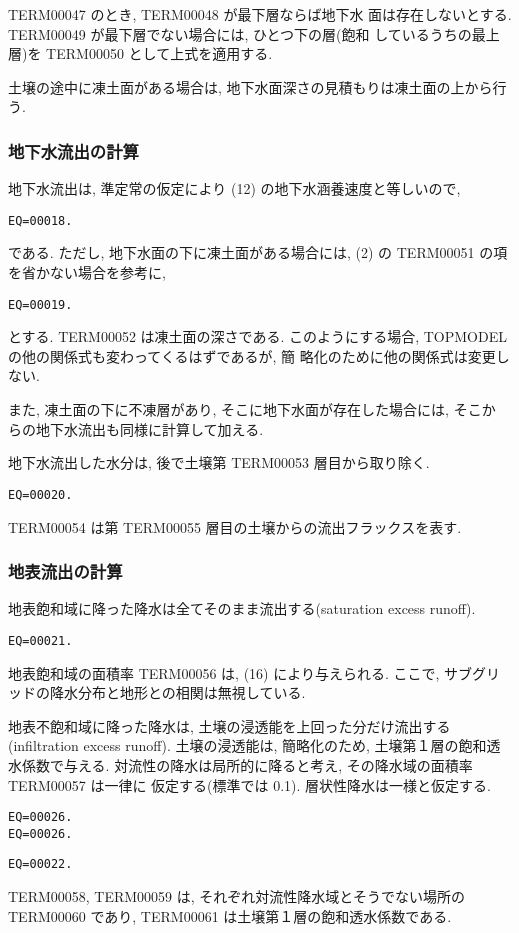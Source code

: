 TERM00047 のとき, TERM00048 が最下層ならば地下水
面は存在しないとする. TERM00049 が最下層でない場合には, ひとつ下の層(飽和
しているうちの最上層)を TERM00050 として上式を適用する.

土壌の途中に凍土面がある場合は, 地下水面深さの見積もりは凍土面の上から行
う.

\subsubsection{地下水流出の計算}

地下水流出は, 準定常の仮定により (12) の地下水涵養速度と等しいので,
\begin{verbatim}
EQ=00018.
\end{verbatim}
である.
ただし, 地下水面の下に凍土面がある場合には, (2) の
TERM00051 の項を省かない場合を参考に,
\begin{verbatim}
EQ=00019.
\end{verbatim}
とする. TERM00052 は凍土面の深さである.
このようにする場合, TOPMODEL の他の関係式も変わってくるはずであるが, 簡
略化のために他の関係式は変更しない.

また, 凍土面の下に不凍層があり, そこに地下水面が存在した場合には, そこか
らの地下水流出も同様に計算して加える.

地下水流出した水分は, 後で土壌第 TERM00053 層目から取り除く.
\begin{verbatim}
EQ=00020.
\end{verbatim}
TERM00054 は第 TERM00055 層目の土壌からの流出フラックスを表す.


\subsubsection{地表流出の計算}

地表飽和域に降った降水は全てそのまま流出する(saturation excess runoff).
\begin{verbatim}
EQ=00021.
\end{verbatim}
地表飽和域の面積率 TERM00056 は, (16) により与えられる.
ここで, サブグリッドの降水分布と地形との相関は無視している.

地表不飽和域に降った降水は, 土壌の浸透能を上回った分だけ流出する
(infiltration excess runoff).
土壌の浸透能は, 簡略化のため, 土壌第１層の飽和透水係数で与える.
対流性の降水は局所的に降ると考え, その降水域の面積率 TERM00057 は一律に
仮定する(標準では 0.1). 層状性降水は一様と仮定する.
\begin{verbatim}
EQ=00026.
EQ=00026.
\end{verbatim}
\begin{verbatim}
EQ=00022.
\end{verbatim}
TERM00058, TERM00059 は, それぞれ対流性降水域とそうでない場所の TERM00060
であり, TERM00061 は土壌第１層の飽和透水係数である.

